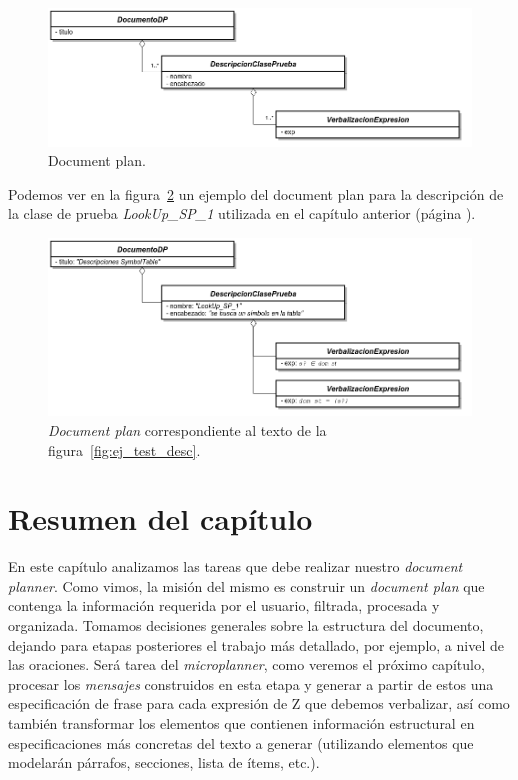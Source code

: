 \begin{figure}[H]
  	\centering
	\includegraphics[scale=0.4]{img/document_plan.png}
	\caption{Document plan.}
  	\label{fig:png_document_plan}
\end{figure}

Podemos ver en la figura~\ref{fig:png_document_plan_ej} un ejemplo del document plan para la descripción de la clase de prueba \emph{LookUp\_SP\_1} utilizada en el capítulo anterior (página \pageref{fig:ej_test_desc}). 

\begin{figure}[H]
  	\centering
	\includegraphics[scale=0.4]{img/document_plan_ej.png}
	\caption{\textit{Document plan} correspondiente al texto de la figura~\ref{fig:ej_test_desc}.}
  	\label{fig:png_document_plan_ej}
\end{figure}

\section{Resumen del capítulo}
En este capítulo analizamos las tareas que debe realizar nuestro \emph{document planner}. Como vimos, la misión del mismo es construir un \emph{document plan} que contenga la información requerida por el usuario, filtrada, procesada y organizada. Tomamos decisiones generales sobre la estructura del documento, dejando para etapas posteriores el trabajo más detallado, por ejemplo, a nivel de las oraciones. Será tarea del \emph{microplanner}, como veremos el próximo capítulo, procesar los \emph{mensajes} construidos en esta etapa y generar a partir de estos una especificación de frase para cada expresión de Z que debemos verbalizar, así como también transformar los elementos que contienen información estructural en especificaciones más concretas del texto a generar (utilizando elementos que modelarán párrafos, secciones, lista de ítems, etc.).
